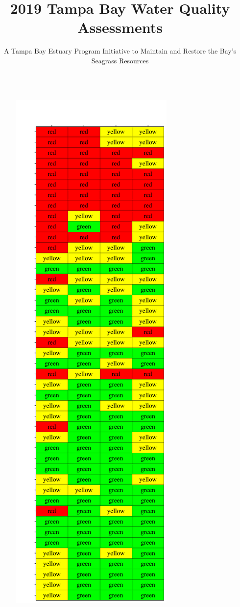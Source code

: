 \documentclass[final,t]{beamer}\usepackage[]{graphicx}\usepackage[]{color}
\title{\Large 2019 Tampa Bay Water Quality Assessments}
\author{\normalsize A Tampa Bay Estuary Program Initiative to Maintain and Restore the Bay's Seagrass Resources}
\begin{document}
\begin{frame}

\vspace{-0.2cm} %
\begin{columns}[t]

\begin{column}{.32\linewidth}

\vspace{-0.1in}


\begin{figure}
\centerline{\includegraphics[trim = 0cm 0cm 0cm 0cm, width=1.1\linewidth]{figure/attainmat.pdf}}

\end{figure}
\end{column}
\end{columns}
\end{frame}
\end{document}
